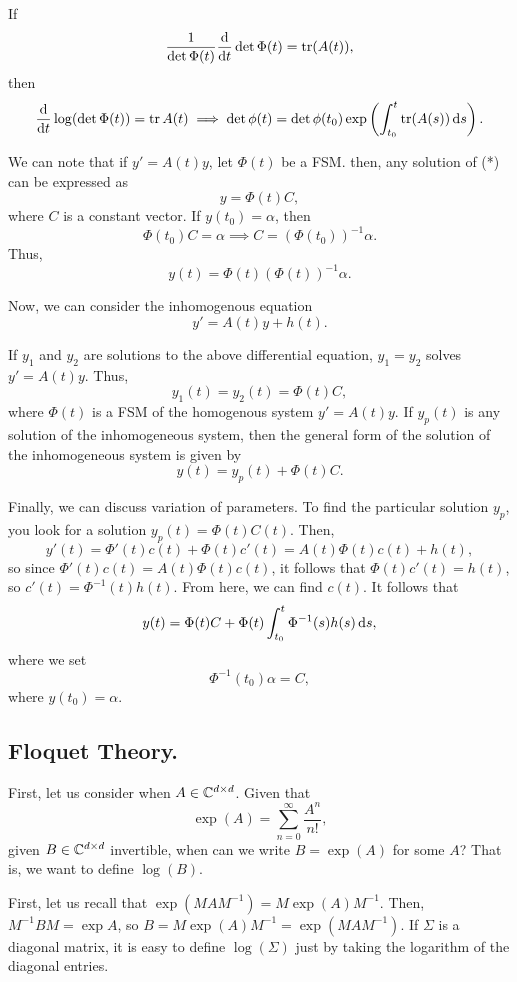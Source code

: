 \documentclass{article}
\begin{document}
    \begin{corollary}{}
        If 
        \[
            \frac{1}{\det \Phi(t)} \dv{t} \det \Phi(t) = \tr(A(t)),
        \]
        then 
        \[
            \dv{t} \log(\det \Phi(t)) = \tr A(t) \implies \det \phi(t) = \det \phi(t_0) \exp \left(\int_{t_0}^t \tr(A(s)) \, \text{d}s\right).
        \]
    \end{corollary}

    We can note that if $y' = A(t) y$, let $\Phi(t)$ be a FSM. then, any solution of (*) can be expressed as 
    \[
        y = \Phi(t) C,
    \]
    where $C$ is a constant vector. If $y(t_0) = \alpha$, then 
    \[
        \Phi(t_0) C = \alpha  \implies C = (\Phi(t_0))^{-1} \alpha.
    \]
    Thus, 
    \[
        y(t) = \Phi(t) (\Phi(t))^{-1}\alpha.
    \]

    \newpar
    Now, we can consider the inhomogenous equation 
    \[
        y' = A(t)y + h(t).
    \]

    If $y_1$ and $y_2$ are solutions to the above differential equation, $y_1 = y_2$ solves $y' = A(t) y$. Thus, 
    \[
        y_1(t) = y_2(t) = \Phi(t) C,
    \]
    where $\Phi(t)$ is a FSM of the homogenous system $y' = A(t) y$. If $y_p(t)$ is any solution of the inhomogeneous system, then the general form of the solution of the inhomogeneous system is given by 
    \[
        y(t) = y_p(t) + \Phi(t) C.
    \]

    Finally, we can discuss variation of parameters. To find the particular solution $y_p$, you look for a solution $y_p(t) = \Phi(t) C(t)$. Then, 
        \[y'(t) = \Phi'(t) c(t) + \Phi(t) c'(t) = A(t) \Phi(t) c(t) + h(t),\]
    so since $\Phi'(t)c(t) = A(t) \Phi(t)c(t)$, it follows that $\Phi(t) c'(t) = h(t)$, so $c'(t) = \Phi^{-1}(t) h(t)$. From here, we can find $c(t)$. It follows that 
        \[y(t) = \Phi(t) C + \Phi(t) \int_{t_0}^t \Phi^{-1}(s) h(s) \, \text{d}s,\]
    where we set 
        \[\Phi^{-1}(t_0) \alpha = C,\]
    where $y(t_0) = \alpha$.

\subsection*{Floquet Theory.}

First, let us consider when $A \in \mathbb{C}^{d \times d}$. Given that 
    \[\exp(A) = \sum_{n = 0}^\infty \frac{A^n}{n!},\]
given $B \in \mathbb{C}^{d \times d}$ invertible, when can we write $B = \exp(A)$ for some $A$? That is, we want to define $\log(B)$. 
\newpar

First, let us recall that $\exp(MAM^{-1}) = M \exp(A) M^{-1}$. Then, $M^{-1} B M = \exp A$, so $B = M\exp(A)M^{-1} = \exp(MAM^{-1})$. If $\Sigma$ is a diagonal matrix, it is easy to define $\log(\Sigma)$ just by taking the logarithm of the diagonal entries. 
\newpar
\end{document}
